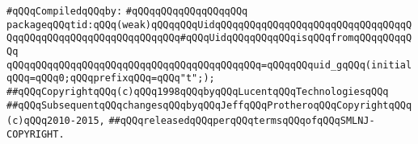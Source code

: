 \label{src/lib/c-kit/src/ast/tid.pkg}
\newline
\verb|#qQQqCompiledqQQqby:|\newline
\verb|#qQQqqQQqqQQqqQQqqQQq|\newline
\newline
\verb|packageqQQqtid:qQQq(weak)qQQqqQQqUidqQQqqQQqqQQqqQQqqQQqqQQqqQQqqQQqqQQqqQQqqQQqqQQqqQQqqQQqqQQqqQQq#qQQqUidqQQqqQQqqQQqisqQQqfromqQQqqQQqqQQq|\newline
\verb|qQQqqQQqqQQqqQQqqQQqqQQqqQQqqQQqqQQqqQQqqQQq=qQQqqQQquid_gqQQq(initialqQQq=qQQq0;qQQqprefixqQQq=qQQq"t";);|\newline
\newline
\newline
\verb|##qQQqCopyrightqQQq(c)qQQq1998qQQqbyqQQqLucentqQQqTechnologiesqQQq|\newline
\verb|##qQQqSubsequentqQQqchangesqQQqbyqQQqJeffqQQqProtheroqQQqCopyrightqQQq(c)qQQq2010-2015,|\newline
\verb|##qQQqreleasedqQQqperqQQqtermsqQQqofqQQqSMLNJ-COPYRIGHT.|\newline

